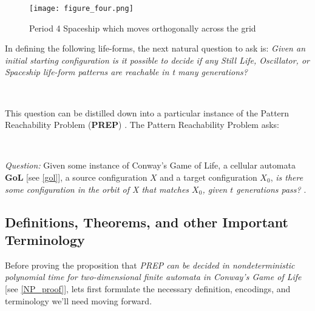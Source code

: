 \documentclass{article}
\theoremstyle{definition}
\theoremstyle{plain}
\theoremstyle{plain}
\begin{document}
 \begin{figure}[ht]
          \centering
    \texttt{[image: figure\_four.png]}
    \caption{Period 4 Spaceship which moves orthogonally across the grid}
    \cite{JG2022conway}
    \label{spaceship_figure}
\end{figure}


In defining the following life-forms, the next natural question to ask is: \textit{Given an initial starting configuration is it possible to decide if any Still Life, Oscillator, or Spaceship life-form patterns are reachable in t many generations?}

\

This question can be distilled down into a particular instance of the Pattern Reachability Problem (\textbf{PREP}) \cite{SUTNER199587}. The Pattern Reachability Problem asks: 

 \

 \textit{Question: } Given some instance of Conway's Game of Life, a cellular automata \textbf{GoL} [see \ref{gol}], a source configuration $X$ and a target configuration \textbf{$X_0$}, \textit{is there some configuration in the orbit of X that matches $X_0$, given $t$ generations pass?} \cite{SUTNER199587}.

\subsection{Definitions, Theorems, and other Important Terminology}
Before proving the proposition that 
\textit {PREP can be decided in nondeterministic polynomial time for two-dimensional finite automata in Conway's Game of Life} [see \ref{NP_proof}], lets first formulate the necessary definition, encodings, and terminology we'll need moving forward.
\end{document}
